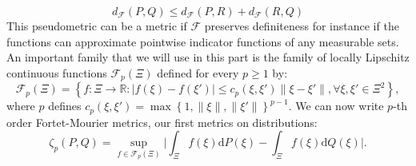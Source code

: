 \documentclass{amsart}
\newcommand{\RR}{\mathbb{R}}
\begin{document}
$$
d_\mathcal{F}\left(P,Q\right)\leq d_\mathcal{F}\left(P,R\right)+d_\mathcal{F}\left(R,Q\right)
$$
This pseudometric can be a metric if $\mathcal{F}$ preserves definiteness for instance if the functions can approximate pointwise indicator functions of any measurable sets. An important family that we will use in this part is the family of locally Lipschitz continuous functions  $\mathcal{F}_p\left(\Xi\right)$ defined for every $p\geq1$ by: 
$$
\mathcal{F}_p\left(\Xi\right)=\left\{f:\Xi\to \RR: \lvert f\left(\xi\right)-f\left(\xi'\right)\rvert \leq c_p\left(\xi,\xi'\right)\lVert\xi-\xi'\rVert, \forall \xi,\xi'\in \Xi^2 \right\},
$$
where $p$ defines $c_p\left(\xi,\xi'\right)=\max\left\{1,\lVert \xi\rVert, \lVert \xi'\rVert\right\}^{p-1}$. We can now write $p$-th order Fortet-Mourier metrics, our first metrics on distributions:
$$
\zeta_p\left(P,Q\right)=\sup_{f\in\mathcal{F}_p\left(\Xi\right)}\lvert \int_\Xi f\left(\xi\right)\text{d}P\left(\xi\right)-\int_\Xi f\left(\xi\right)\text{d}Q\left(\xi\right)\rvert.
$$
\end{document}
